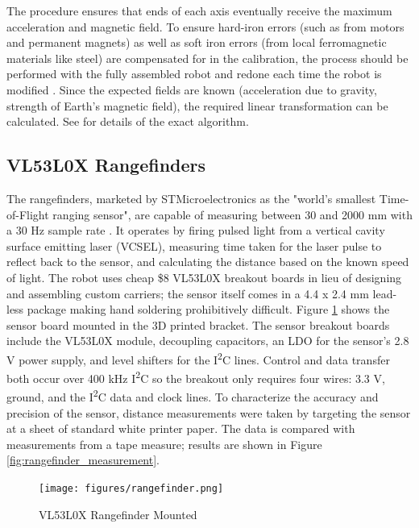 The procedure ensures that ends of each axis eventually receive the maximum acceleration and magnetic field. To ensure hard-iron errors (such as from motors and permanent magnets) as well as soft iron errors (from local ferromagnetic materials like steel) are compensated for in the calibration, the process should be performed with the fully assembled robot and redone each time the robot is modified \cite{hard_soft_correction}. Since the expected fields are known (acceleration due to gravity, strength of Earth's magnetic field), the required linear transformation can be calculated. See \cite{freeimu} for details of the exact algorithm.

\subsection{VL53L0X Rangefinders}
The rangefinders, marketed by STMicroelectronics as the "world's smallest Time-of-Flight ranging sensor", are capable of measuring between 30 and 2000 mm with a 30 Hz sample rate \cite{vl53l0x}. It operates by firing pulsed light from a vertical cavity surface emitting laser (VCSEL), measuring time taken for the laser pulse to reflect back to the sensor, and calculating the distance based on the known speed of light. The robot uses cheap \$8 VL53L0X breakout boards in lieu of designing and assembling custom carriers; the sensor itself comes in a 4.4 x 2.4 mm lead-less package making hand soldering prohibitively difficult. Figure \ref{fig:rangefinder} shows the sensor board mounted in the 3D printed bracket. The sensor breakout boards include the VL53L0X module, decoupling capacitors, an LDO for the sensor's 2.8 V power supply, and level shifters for the I\textsuperscript{2}C lines. Control and data transfer both occur over 400 kHz I\textsuperscript{2}C so the breakout only requires four wires: 3.3 V, ground, and the I\textsuperscript{2}C data and clock lines. To characterize the accuracy and precision of the sensor, distance measurements were taken by targeting the sensor at a sheet of standard white printer paper. The data is compared with measurements from a tape measure; results are shown in Figure \ref{fig:rangefinder_measurement}. 

\begin{figure}[H]   %
	\centering \texttt{[image: figures/rangefinder.png]}
	\caption{VL53L0X Rangefinder Mounted}\label{fig:rangefinder}
\end{figure}


